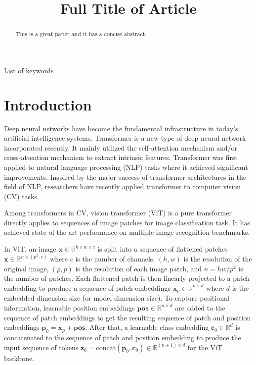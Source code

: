 \documentclass[anon,12pt]{colt2024} %
\title[Short Title]{Full Title of Article}
\begin{document}
\maketitle

\begin{abstract}%
  This is a great paper and it has a concise abstract.%
\end{abstract}

\begin{keywords}%
  List of keywords%
\end{keywords}

\section{Introduction}

Deep neural networks have become the fundamental infrastructure in today's artificial intelligence systems. 
Transformer is a new type of deep neural network incorporated recently.
It mainly utilized the self-attention mechanism and/or cross-attention mechanism to extract intrinsic features.
Transformer was first applied to natural language processing (NLP) tasks where it achieved significant improvements.
Inspired by the major success of transformer architectures in the field of NLP, researchers have recently applied transformer to computer vision (CV) tasks.

Among transformers in CV, vision transformer (ViT) is a pure transformer directly applies to sequences of image patches for image classification task.
It has achieved state-of-the-art performance on multiple image recognition benchmarks.

In ViT, an image $\mathbf{x} \in \mathbb{R} ^ {h \times w \times c}$ is split into a sequence of flattened patches $\mathbf{x} \in \mathbb{R} ^ {n \times (p^2 \cdot c)}$ where $c$ is the number of channels, $(h,w)$ is the resolution of the original image, $(p,p)$ is the resolution of each image patch, and $n=hw/p^2$ is the number of patches.
Each flattened patch is then linearly projected to a patch embedding to produce a sequence of patch embeddings $\mathbf{x}_p \in \mathbb{R} ^ {n \times d}$ where $d$ is the embedded dimension size (or model dimension size).
To capture positional information, learnable position embeddings $\mathbf{pos} \in \mathbb{R} ^ {n \times d}$ are added to the sequence of patch embeddings to get the resulting sequence of patch and position embeddings $\mathbf{p}_0 = \mathbf{x}_p + \mathbf{pos}$.
After that, a learnable class embedding $\mathbf{c}_0 \in \mathbb{R}^d$ is concatenated to the sequence of patch and position embedding to produce the input sequence of tokens $\mathbf{z}_0 = \mathrm{concat}(\mathbf{p}_0,  \mathbf{c}_0) \in \mathbb{R} ^ {(n+1) \times d}$ for the ViT backbone.
\end{document}
